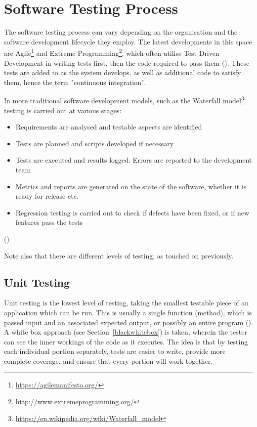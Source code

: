 \documentclass[12pt]{article}
\begin{document}
\section{Software Testing Process}

The software testing process can vary depending on the organisation and the software development lifecycle they employ. The latest developments in this space are Agile\footnote{\url{https://agilemanifesto.org/}} and Extreme Programming\footnote{\url{http://www.extremeprogramming.org/}}, which often utilise Test Driven Development in writing tests first, then the code required to pass them (). These tests are added to as the system develops, as well as additional code to satisfy them, hence the term "continuous integration". 

In more traditional software development models, such as the Waterfall model\footnote{\url{https://en.wikipedia.org/wiki/Waterfall_model}} testing is carried out at various stages:

\begin{itemize}
  \item Requirements are analysed and testable aspects are identified
  \item Tests are planned and scripts developed if necessary
  \item Tests are executed and results logged. Errors are reported to the development team
  \item Metrics and reports are generated on the state of the software, whether it is ready for release etc.
  \item Regression testing is carried out to check if defects have been fixed, or if new features pass the tests
\end{itemize}
()

Note also that there are different levels of testing, as touched on previously.


\subsection{Unit Testing} \label{unit_testing}

Unit testing is the lowest level of testing, taking the smallest testable piece of an application which can be run. This is usually a single function (method), which is passed input and an associated expected output, or possibly an entire program (). A white box approach (see Section~\ref{blackwhitebox}) is taken, wherein the tester can see the inner workings of the code as it executes. The idea is that by testing each individual portion separately, tests are easier to write, provide more complete coverage, and ensure that every portion will work together.
\end{document}
